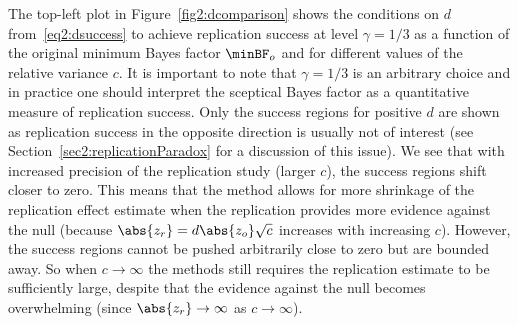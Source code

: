 The top-left plot in Figure~\ref{fig2:dcomparison} shows the conditions on $d$
from~\eqref{eq2:dsuccess} to achieve replication success at level $\gamma = 1/3$
as a function of the original minimum Bayes factor $\minBF_{o}$ and for
different values of the relative variance $c$. It is important to note that
$\gamma = 1/3$ is an arbitrary choice and in practice one should interpret the
sceptical Bayes factor as a quantitative measure of replication success. Only
the success regions for positive $d$ are shown as replication success in the
opposite direction is usually not of interest (see
Section~\ref{sec2:replicationParadox} for a discussion of this issue). We see
that with increased precision of the replication study (larger $c$), the success
regions shift closer to zero. This means that the method allows for more
shrinkage of the replication effect estimate when the replication provides more
evidence against the null (because $\abs{z_{r}} = d \abs{z_{o}} \sqrt{c}$
increases with increasing $c$). However, the success regions cannot be pushed
arbitrarily close to zero but are bounded away. So when $c \to \infty$ the
methods still requires the replication estimate to be sufficiently large,
despite that the evidence against the null becomes overwhelming (since
$\abs{z_{r}} \to \infty$ as $c \to \infty$).

